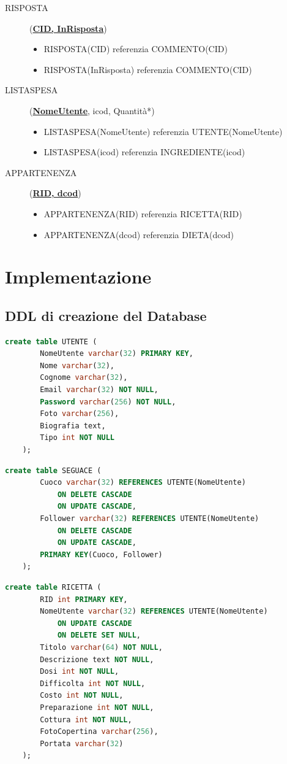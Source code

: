 \documentclass[12pt]{extarticle}
\begin{document}
\begin{description}
    \item[RISPOSTA] (\textbf{\uline{CID, InRisposta}})
    \begin{itemize}
        \item RISPOSTA(CID) referenzia COMMENTO(CID)
        \item RISPOSTA(InRisposta) referenzia COMMENTO(CID)
    \end{itemize}
    \item[LISTASPESA] (\textbf{\uline{NomeUtente}}, icod, Quantità*)
    \begin{itemize}
        \item LISTASPESA(NomeUtente) referenzia UTENTE(NomeUtente) 
        \item LISTASPESA(icod) referenzia INGREDIENTE(icod)
    \end{itemize}   
    \item[APPARTENENZA] (\textbf{\uline{RID, dcod}})
    \begin{itemize}
        \item APPARTENENZA(RID) referenzia RICETTA(RID)
        \item APPARTENENZA(dcod) referenzia DIETA(dcod)
    \end{itemize} 

    
\end{description}    


\section{Implementazione}
\subsection{DDL di creazione del Database}
\begin{lstlisting}[language=SQL]
    create table UTENTE (
        NomeUtente varchar(32) PRIMARY KEY,
        Nome varchar(32),
        Cognome varchar(32),
        Email varchar(32) NOT NULL,
        Password varchar(256) NOT NULL,
        Foto varchar(256),
        Biografia text,
        Tipo int NOT NULL
    );
\end{lstlisting}
\begin{lstlisting}[language=SQL]
    create table SEGUACE (
        Cuoco varchar(32) REFERENCES UTENTE(NomeUtente)
            ON DELETE CASCADE
            ON UPDATE CASCADE,
        Follower varchar(32) REFERENCES UTENTE(NomeUtente)
            ON DELETE CASCADE
            ON UPDATE CASCADE,
        PRIMARY KEY(Cuoco, Follower)
    );
\end{lstlisting}
\begin{lstlisting}[language=SQL]
    create table RICETTA (
        RID int PRIMARY KEY,
        NomeUtente varchar(32) REFERENCES UTENTE(NomeUtente)
            ON UPDATE CASCADE
            ON DELETE SET NULL,
        Titolo varchar(64) NOT NULL,
        Descrizione text NOT NULL,
        Dosi int NOT NULL,
        Difficolta int NOT NULL,
        Costo int NOT NULL,
        Preparazione int NOT NULL,
        Cottura int NOT NULL,
        FotoCopertina varchar(256),
        Portata varchar(32)
    );
\end{lstlisting}
\end{document}
